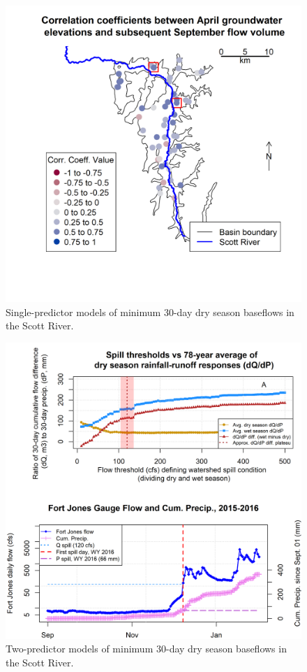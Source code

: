 \documentclass[hess, manuscript]{copernicus}
\begin{document}
\begin{figure}
\includegraphics[width=1\linewidth]{f09} \caption{\label{fig:one_predictor_model} Single-predictor models of minimum 30-day dry season baseflows in the Scott River.}\label{fig:one_predictor_model}
\end{figure}

\begin{figure}
\includegraphics[width=1\linewidth]{f10} \caption{\label{fig:two_predictor_model} Two-predictor models of minimum 30-day dry season baseflows in the Scott River.}\label{fig:two_predictor_model}
\end{figure}
\end{document}
